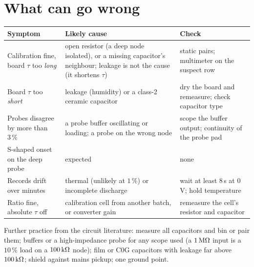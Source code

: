 \documentclass[11pt,a4paper]{article}
\begin{document}
\section{What can go wrong}\label{sec:fail}
\begin{center}\small\begin{tabular}{p{4.6cm}p{5.2cm}p{4.8cm}}\toprule
Symptom & Likely cause & Check \\ \midrule
Calibration fine, board $\tau$ too \emph{long} & open resistor (a deep node isolated), or a missing capacitor's neighbour; leakage is not the cause (it shortens $\tau$) & static pairs; multimeter on the suspect row \\
Board $\tau$ too \emph{short} & leakage (humidity) or a class-2 ceramic capacitor & dry the board and remeasure; check capacitor type \\
Probes disagree by more than $3\,\%$ & a probe buffer oscillating or loading; a probe on the wrong node & scope the buffer output; continuity of the probe pad \\
S-shaped onset on the deep probe & expected & none \\
Records drift over minutes & thermal (unlikely at $1\,\%$) or incomplete discharge & wait at least $8$\,s at $0$\,V; hold temperature \\
Ratio fine, absolute $\tau$ off & calibration cell from another batch, or converter gain & remeasure the cell's resistor and capacitor \\ \bottomrule
\end{tabular}\end{center}
Further practice from the circuit literature: measure all capacitors and bin or pair them; buffers or a high-impedance probe for any scope used (a $1\,{\rm M}\Omega$ input is a $10\,\%$ load on a $100\,{\rm k}\Omega$ node); film or C0G capacitors with leakage far above $100\,{\rm k}\Omega$; shield against mains pickup; one ground point.
\end{document}
